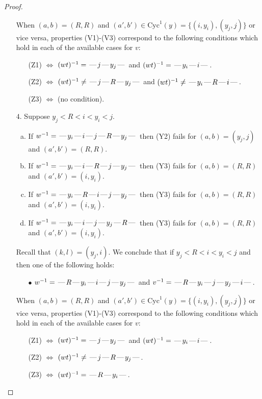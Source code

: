 \documentclass[10pt]{article}
\theoremstyle{definition}
\theoremstyle{definition}
\def\dash{\text{\hspace{0.5mm}---\hspace{0.5mm}}}
\def\Cyc{\mathrm{Cyc}}
\begin{document}
\begin{proof}
\begin{enumerate}
\begin{enumerate}
\end{enumerate}
When $(a,b)= (R, R)$ and $(a',b')\in \Cyc^1(y)=\{(i,y_i),(y_j,j)\}$ or vice versa,
properties (V1)-(V3) correspond to the following conditions which hold in
each of the available cases for $v$:
\begin{enumerate}
\item[](Z1) $\Leftrightarrow$ $(wt)^{-1} = \dash j \dash y_j \dash$  and $(wt)^{-1} = \dash y_i \dash i \dash$.
\item[](Z2) $\Leftrightarrow$ $(wt)^{-1} \neq \dash j \dash R \dash y_j \dash$  and $(wt)^{-1} \neq \dash y_i \dash R \dash i \dash$.
\item[](Z3) $\Leftrightarrow$ (no condition).
\end{enumerate}
\item[$4$.] Suppose $y_j < R < i < y_i < j$.
\begin{enumerate}[(a)]
\item If $w^{-1} = \dash y_i\dash i\dash j\dash R\dash y_j\dash $ then (Y2) fails for $(a,b)=(y_j,j)$ and $(a',b')=(R,R)$.
\item If $w^{-1} = \dash y_i\dash i\dash R\dash j\dash y_j\dash $ then (Y3) fails for $(a,b)=(R,R)$ and $(a',b')=(i,y_i)$.
\item If $w^{-1} = \dash y_i\dash R\dash i\dash j\dash y_j\dash $ then (Y3) fails for $(a,b)=(R,R)$ and $(a',b')=(i,y_i)$.
\item If $w^{-1} = \dash y_i\dash i\dash j\dash y_j\dash R\dash $ then (Y3) fails for $(a,b)=(R,R)$ and $(a',b')=(i,y_i)$.
\end{enumerate}
Recall that $(k,l) = (y_j,i)$.
We conclude that if $y_j < R < i < y_i < j$ and then one of the following holds:
\begin{enumerate}
\item[$\bullet$] $w^{-1} = \dash R\dash y_i\dash i\dash j\dash y_j\dash $ and $v^{-1} = \dash R\dash y_i\dash j\dash y_j\dash i\dash $.
\end{enumerate}
When $(a,b)= (R, R)$ and $(a',b')\in \Cyc^1(y)=\{(i,y_i),(y_j,j)\}$ or vice versa,
properties (V1)-(V3) correspond to the following conditions which hold in
each of the available cases for $v$:
\begin{enumerate}
\item[](Z1) $\Leftrightarrow$ $(wt)^{-1} = \dash j \dash y_j \dash$  and $(wt)^{-1} = \dash y_i \dash i \dash$.
\item[](Z2) $\Leftrightarrow$ $(wt)^{-1} \neq \dash j \dash R \dash y_j \dash$.
\item[](Z3) $\Leftrightarrow$ $(wt)^{-1} = \dash R \dash y_i \dash$.

\end{enumerate}
\end{enumerate}
\end{proof}
\end{document}
